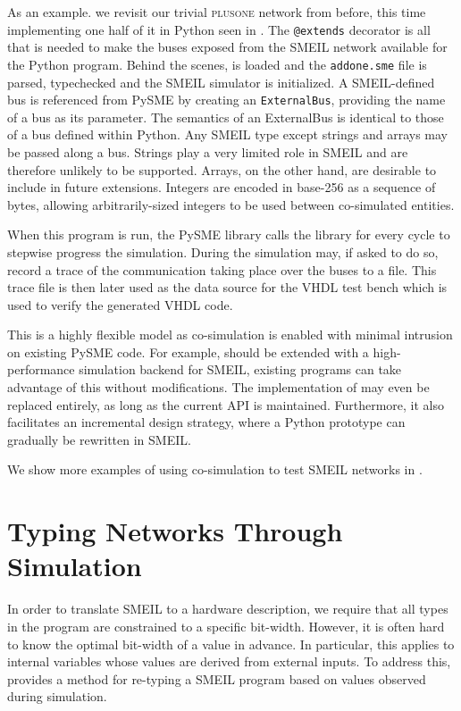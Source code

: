 As an example. we revisit our trivial \textsc{plusone} network from before, this
time implementing one half of it in Python seen in . The
\texttt{@extends} decorator is all that is needed to make the buses exposed from
the SMEIL network available for the Python program. Behind the scenes, \libsme{}
is loaded and the \texttt{addone.sme} file is parsed, typechecked and the
\libsme{} SMEIL simulator is initialized. A SMEIL-defined bus is referenced from
PySME by creating an \texttt{ExternalBus}, providing the name of a bus as its
parameter. The semantics of an {\ttfamily ExternalBus} is identical to those of
a bus defined within Python. Any SMEIL type except strings and arrays may be
passed along a bus. Strings play a very limited role in SMEIL and are therefore
unlikely to be supported. Arrays, on the other hand, are desirable to include in
future extensions. Integers are encoded in base-256 as a sequence of bytes,
allowing arbitrarily-sized integers to be used between co-simulated entities.

When this program is run, the PySME library calls the \libsme{} library for
every cycle to stepwise progress the simulation. During the simulation \libsme{}
may, if asked to do so, record a trace of the communication taking place over
the buses to a file. This trace file is then later used as the data source for
the VHDL test bench which is used to verify the generated VHDL code.

This is a highly flexible model as co-simulation is enabled with minimal
intrusion on existing PySME code. For example, should \libsme{} be extended with
a high-performance simulation backend for SMEIL, existing programs can take
advantage of this without modifications. The implementation of \libsme{} may
even be replaced entirely, as long as the current API is
maintained. Furthermore, it also facilitates an incremental design strategy,
where a Python prototype can gradually be rewritten in SMEIL.

We show more examples of using co-simulation to test SMEIL networks in
.



\section{Typing Networks Through Simulation}
\label{sec:typing}
  In order to translate SMEIL to a hardware
description, we require that all types in the program are constrained to a
specific bit-width. However, it is often hard to know the optimal bit-width of a
value in advance. In particular, this applies to internal variables whose values
are derived from external inputs. To address this, \libsme{} provides a method
for re-typing a SMEIL program based on values observed during simulation.

